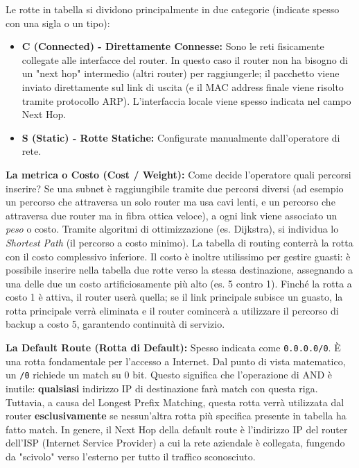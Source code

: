 Le rotte in tabella si dividono principalmente in due categorie (indicate spesso con una sigla o un tipo):
\begin{itemize}
    \item \textbf{C (Connected) - Direttamente Connesse:} Sono le reti fisicamente collegate alle interfacce del router. In questo caso il router non ha bisogno di un "next hop" intermedio (altri router) per raggiungerle; il pacchetto viene inviato direttamente sul link di uscita (e il MAC address finale viene risolto tramite protocollo ARP). L'interfaccia locale viene spesso indicata nel campo Next Hop.
    \item \textbf{S (Static) - Rotte Statiche:} Configurate manualmente dall'operatore di rete.
\end{itemize}

\textbf{La metrica o Costo (Cost / Weight):}
Come decide l'operatore quali percorsi inserire? Se una subnet è raggiungibile tramite due percorsi diversi (ad esempio un percorso che attraversa un solo router ma usa cavi lenti, e un percorso che attraversa due router ma in fibra ottica veloce), a ogni link viene associato un \textit{peso} o costo. Tramite algoritmi di ottimizzazione (es. Dijkstra), si individua lo \textit{Shortest Path} (il percorso a costo minimo). La tabella di routing conterrà la rotta con il costo complessivo inferiore.
Il costo è inoltre utilissimo per gestire guasti: è possibile inserire nella tabella due rotte verso la stessa destinazione, assegnando a una delle due un costo artificiosamente più alto (es. 5 contro 1). Finché la rotta a costo 1 è attiva, il router userà quella; se il link principale subisce un guasto, la rotta principale verrà eliminata e il router comincerà a utilizzare il percorso di backup a costo 5, garantendo continuità di servizio.

\textbf{La Default Route (Rotta di Default):}
Spesso indicata come \texttt{0.0.0.0/0}. È una rotta fondamentale per l'accesso a Internet. 
Dal punto di vista matematico, un \texttt{/0} richiede un match su 0 bit. Questo significa che l'operazione di AND è inutile: \textbf{qualsiasi} indirizzo IP di destinazione farà match con questa riga. Tuttavia, a causa del Longest Prefix Matching, questa rotta verrà utilizzata dal router \textbf{esclusivamente} se nessun'altra rotta più specifica presente in tabella ha fatto match. In genere, il Next Hop della default route è l'indirizzo IP del router dell'ISP (Internet Service Provider) a cui la rete aziendale è collegata, fungendo da "scivolo" verso l'esterno per tutto il traffico sconosciuto.

